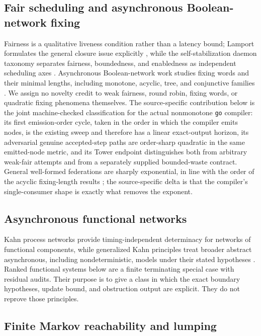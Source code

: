 \documentclass[11pt]{article}
\theoremstyle{definition}
\theoremstyle{remark}
\numberwithin{equation}{section}
\begin{document}
\subsection{Fair scheduling and asynchronous Boolean-network fixing}

Fairness is a qualitative liveness condition rather than a latency bound;
Lamport formulates the general closure issue explicitly
\citep{Lamport2000Fairness}, while the self-stabilization daemon taxonomy
separates fairness, boundedness, and enabledness as independent scheduling
axes \citep{DuboisTixeuil2011}.  Asynchronous Boolean-network work studies
fixing words and their minimal lengths, including monotone, acyclic, tree, and
conjunctive families \citep{AracenaEtAl2019,GadouleauRichard2018}.  We assign
no novelty credit to weak fairness, round robin, fixing words, or quadratic
fixing phenomena themselves.  The source-specific contribution below is the
joint machine-checked classification for the actual nonmonotone
\texttt{go} compiler: its first emission-order cycle, taken in the order in
which the compiler emits nodes, is the existing sweep and
therefore has a linear exact-output horizon, its adversarial genuine
accepted-step paths are order-sharp quadratic in the same emitted-node metric,
and its Tower endpoint distinguishes both from arbitrary weak-fair attempts
and from a separately supplied bounded-waste contract.  General well-formed
federations are sharply exponential, in line with the order of the acyclic
fixing-length results \citep{GadouleauRichard2018}; the source-specific delta
is that the compiler's single-consumer shape is exactly what removes the
exponent.

\subsection{Asynchronous functional networks}

Kahn process networks provide timing-independent determinacy for networks of
functional components, while generalized Kahn principles treat broader
abstract asynchronous, including nondeterministic, models under their stated
hypotheses \citep{Kahn1974,Abramsky2011}.  Ranked functional systems below
are a finite terminating special case with residual audits.  Their purpose is
to give a class in which the exact boundary hypotheses, update bound, and
obstruction output are explicit.  They do not reprove those principles.

\subsection{Finite Markov reachability and lumping}
\end{document}
